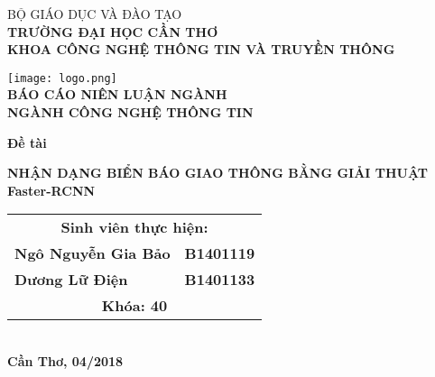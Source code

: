 \documentclass[../thesis.tex]{subfiles}
\begin{document}
\begin{titlepage}

\begin{center}

BỘ GIÁO DỤC VÀ ĐÀO TẠO\\
\textbf{TRƯỜNG ĐẠI HỌC CẦN THƠ\\}
\textbf{KHOA CÔNG NGHỆ THÔNG TIN VÀ TRUYỀN THÔNG\\[1cm]}

\texttt{[image: logo.png]}\\[1cm]

\textbf{BÁO CÁO NIÊN LUẬN NGÀNH\\}
\textbf{NGÀNH CÔNG NGHỆ THÔNG TIN\\[2cm]}

\begin{large}
\textbf{Đề tài\\[0.5cm]}
\end{large}
\textbf{{\LARGE NHẬN DẠNG BIỂN BÁO GIAO THÔNG BẰNG GIẢI THUẬT Faster-RCNN}}
\\[3.5cm]

\begin{tabular}{ l l }
	\multicolumn{2}{c}{\textbf{Sinh viên thực hiện:}}\\ 
	\textbf{Ngô Nguyễn Gia Bảo} & \textbf{B1401119}\\  
	\textbf{Dương Lữ Điện} & \textbf{B1401133}\\
	\multicolumn{2}{c}{\textbf{Khóa: 40}}\\   
\end{tabular}
\\[4cm]

\textbf{Cần Thơ, 04/2018}

\end{center}

\end{titlepage}
\end{document}
